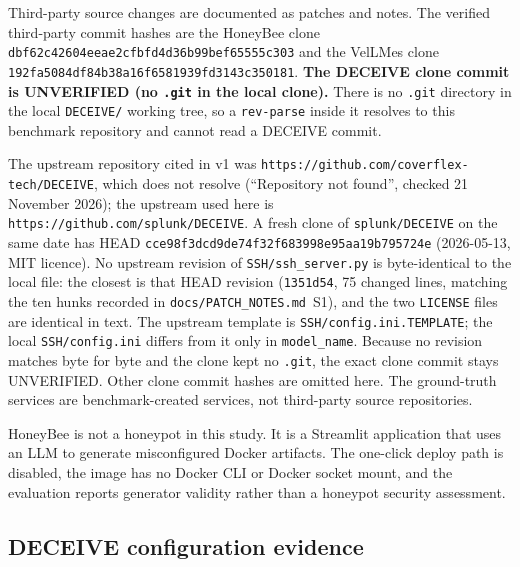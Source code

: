 \documentclass[a4paper,11pt]{article}
\begin{document}
Third-party source changes are documented as patches and notes. The verified
third-party commit hashes are the HoneyBee clone
\texttt{dbf62c42604eeae2cfbfd4d36b99bef65555c303} and the VelLMes clone
\texttt{192fa5084df84b38a16f6581939fd3143c350181}. \textbf{The DECEIVE clone
commit is UNVERIFIED (no \texttt{.git} in the local clone).} There is no
\texttt{.git} directory in the local \texttt{DECEIVE/} working tree, so a
\texttt{rev-parse} inside it resolves to this benchmark repository and cannot
read a DECEIVE commit.

The upstream repository cited in v1 was
\texttt{https://github.com/coverflex-tech/DECEIVE}, which does not resolve
(``Repository not found'', checked 21 November 2026); the upstream used here
is \texttt{https://github.com/splunk/DECEIVE}. A fresh clone of
\texttt{splunk/DECEIVE} on the same date has HEAD
\texttt{cce98f3dcd9de74f32f683998e95aa19b795724e} (2026-05-13, MIT licence).
No upstream revision of \texttt{SSH/ssh\_server.py} is byte-identical to the
local file: the closest is that HEAD revision (\texttt{1351d54}, 75 changed
lines, matching the ten hunks recorded in \texttt{docs/PATCH\_NOTES.md}~S1),
and the two \texttt{LICENSE} files are identical in text. The upstream
template is \texttt{SSH/config.ini.TEMPLATE}; the local \texttt{SSH/config.ini}
differs from it only in \texttt{model\_name}. Because no revision matches byte
for byte and the clone kept no \texttt{.git}, the exact clone commit stays
UNVERIFIED. Other clone commit hashes are omitted here. The ground-truth
services are benchmark-created services, not third-party source repositories.

HoneyBee is not a honeypot in this study. It is a Streamlit application that
uses an LLM to generate misconfigured Docker artifacts. The one-click deploy
path is disabled, the image has no Docker CLI or Docker socket mount, and the
evaluation reports generator validity rather than a honeypot security
assessment.

\subsection{DECEIVE configuration evidence}
\end{document}
